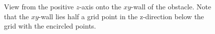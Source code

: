 \begin{figure}[h]
        
        
        
        
    \caption{View from the positive $z$-axis onto the $xy$-wall of the obstacle. Note that the $xy$-wall lies half a grid point in the z-direction below the grid with the encircled points. 
 }\label{fig:3dpictin2d}
\end{figure}








